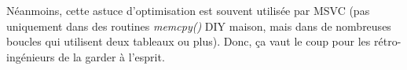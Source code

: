 Néanmoins, cette astuce d'optimisation est souvent utilisée par MSVC (pas uniquement
dans des routines \emph{memcpy()} \ac{DIY} maison, mais dans de nombreuses boucles
qui utilisent deux tableaux ou plus).
Donc, ça vaut le coup pour les rétro-ingénieurs de la garder à l'esprit.


